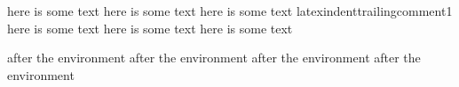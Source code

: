 \begin{myenvironment}
		here is some text       %
		here is some text 
		here is some text %
		latexindenttrailingcomment1
		here is some text 
		here is some text %
		here is some text %
\end{myenvironment}
after the environment%
after the environment       %
after the environment  %
after the environment%
